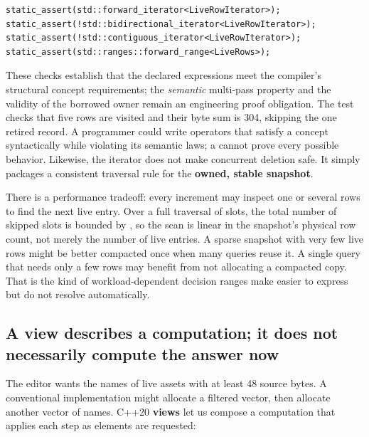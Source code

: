 \begin{verbatim}
static_assert(std::forward_iterator<LiveRowIterator>);
static_assert(!std::bidirectional_iterator<LiveRowIterator>);
static_assert(!std::contiguous_iterator<LiveRowIterator>);
static_assert(std::ranges::forward_range<LiveRows>);
\end{verbatim}

These checks establish that the declared expressions meet the compiler's structural concept requirements; the \emph{semantic} multi-pass property and the validity of the borrowed owner remain an engineering proof obligation. The test checks that five rows are visited and their byte sum is 304, skipping the one retired record. A programmer could write operators that satisfy a concept syntactically while violating its semantic laws; a  cannot prove every possible behavior. Likewise, the iterator does not make concurrent deletion safe. It simply packages a consistent traversal rule for the \textbf{owned, stable snapshot}.

There is a performance tradeoff: every increment may inspect one or several rows to find the next live entry. Over a full traversal of  slots, the total number of skipped slots is bounded by , so the scan is linear in the snapshot's physical row count, not merely the number of live entries. A sparse snapshot with very few live rows might be better compacted once when many queries reuse it. A single query that needs only a few rows may benefit from not allocating a compacted copy. That is the kind of workload-dependent decision ranges make easier to express but do not resolve automatically.

\subsection{A view describes a computation; it does not necessarily compute the answer now}\label{01-foundations-i-ch006-a-view-describes-a-computation-it-does-not-necessarily-compute-the-answer-now}

\hypertarget{01-foundations-i-ch006-a-view-describes-a-computation-it-does-not-necessarily-compute-the-answer-now}{}

The editor wants the names of live assets with at least 48 source bytes. A conventional implementation might allocate a filtered vector, then allocate another vector of names. C++20 \textbf{views} let us compose a computation that applies each step as elements are requested:

